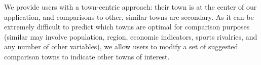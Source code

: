 \documentclass[10pt]{article}\usepackage[]{graphicx}\usepackage[]{color}
\begin{document}



We provide users with a town-centric approach: their town is at the center of our application, and comparisons to other, similar towns are secondary. As it can be extremely difficult to predict which towns are optimal for comparison purposes (similar may involve population, region, economic indicators, sports rivalries, and any number of other variables), we allow users to modify a set of suggested comparison towns to indicate other towns of interest.
\end{document}
